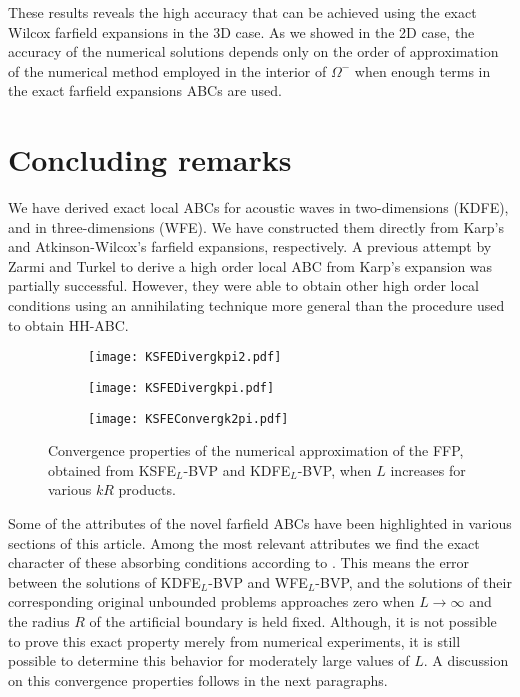 \documentclass[final,3p,times,12pt]{elsarticle}
\begin{document}
These results reveals the high accuracy that can be achieved using the exact Wilcox farfield expansions in the 3D case. As we showed in the 2D case, the accuracy of the numerical solutions depends only on the order of approximation of the numerical method employed in the interior of $\Omega^{-}$ when enough terms in the exact farfield expansions ABCs are used.

\section{Concluding remarks}
\label{Section.Conclusions}
We have derived exact local ABCs for acoustic waves in two-dimensions (KDFE), and in three-dimensions (WFE).  We have constructed them directly from Karp's and Atkinson-Wilcox's farfield expansions, respectively. A previous attempt by Zarmi and Turkel \cite{Zarmi-Turkel} to derive a high order local ABC from Karp's expansion was partially successful. However, they were able to obtain other high order local conditions using an annihilating technique more general than the procedure used to obtain HH-ABC.

\begin{figure}[!h]
\begin{subfigure}{0.33\textwidth}
\texttt{[image: KSFEDivergkpi2.pdf]} 
\end{subfigure}
\begin{subfigure}{0.33\textwidth}
\texttt{[image: KSFEDivergkpi.pdf]}
\end{subfigure}
\begin{subfigure}{0.33\textwidth}
\texttt{[image: KSFEConvergk2pi.pdf]}
\end{subfigure}
\caption{Convergence properties of the numerical approximation of the FFP, obtained from KSFE$_L$-BVP and KDFE$_L$-BVP, when $L$ increases for various $kR$ products.} 
\label{FFEConvergence3}
\end{figure}

Some of the attributes of the novel farfield ABCs have been highlighted in various sections of this article. 
Among the most relevant attributes we find the exact character of these absorbing conditions according to \cite{GivoliReview2}. This means the error between the solutions of KDFE$_L$-BVP  and WFE$_L$-BVP, and the solutions of their corresponding original unbounded problems approaches zero when $L\rightarrow\infty$ and the radius $R$ of the artificial boundary is held fixed. Although, it is not possible to prove this exact property merely from numerical experiments, it is still possible to determine this behavior for moderately large values of $L$. A discussion on this convergence properties follows in the next paragraphs. 
\end{document}
